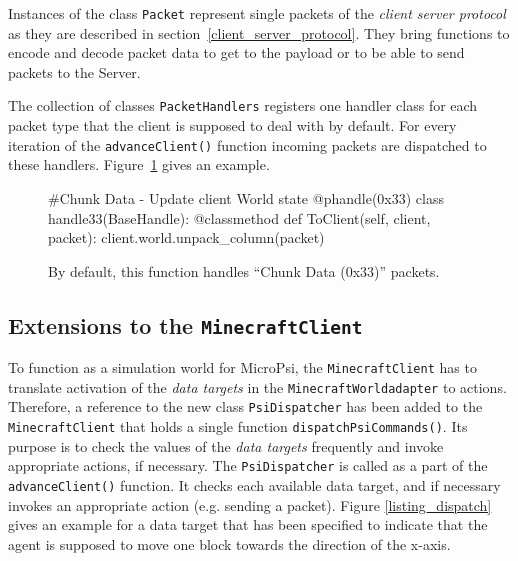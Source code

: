 Instances of the class \texttt{Packet} represent single packets of the \emph{client server protocol} as they are described in section~\ref{client_server_protocol}. They bring functions to encode and decode packet data to get to the payload or to be able to send packets to the Server.

The collection of classes \texttt{PacketHandlers} registers one handler class for each packet type that the client is supposed to deal with by default. For every iteration of the \texttt{advanceClient()} function incoming packets are dispatched to these handlers. Figure~\ref{packet_handling} gives an example.


		\begin{figure}[ht]
			\centering
			\begin{minipage}{11cm}
				\begin{pseudocode}
#Chunk Data - Update client World state
@phandle(0x33)
class handle33(BaseHandle):
	@classmethod
	def ToClient(self, client, packet):
		client.world.unpack_column(packet)
					\end{pseudocode}
				\caption{By default, this function handles ``Chunk Data (0x33)'' packets.}
				\label{packet_handling}
			\end{minipage}
		\end{figure}

        \subsection{Extensions to the \texttt{MinecraftClient}}
        \label{extensions_client}
To function as a simulation world for MicroPsi, the \texttt{MinecraftClient} has to translate activation of the \emph{data targets} in the \texttt{MinecraftWorldadapter} to actions. Therefore, a reference to the new class \texttt{PsiDispatcher} has been added to the \texttt{MinecraftClient} that holds a single function \texttt{dispatchPsiCommands()}. Its purpose is to check the values of the \emph{data targets} frequently and invoke appropriate actions, if necessary. The \texttt{PsiDispatcher} is called as a part of the \texttt{advanceClient()} function. It checks each available data target, and if necessary invokes an appropriate action (e.g. sending a packet). Figure \ref{listing_dispatch} gives an example for a data target that has been specified to indicate that the agent is supposed to move one block towards the direction of the x-axis.

